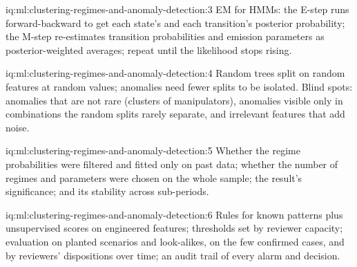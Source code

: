 \begin{solution}{iq:ml:clustering-regimes-and-anomaly-detection:3}
EM for HMMs: the E-step runs forward-backward to get each state's and each transition's posterior probability; the M-step
re-estimates transition probabilities and emission parameters as posterior-weighted averages; repeat until the likelihood stops
rising.
\end{solution}

\begin{solution}{iq:ml:clustering-regimes-and-anomaly-detection:4}
Random trees split on random features at random values; anomalies need fewer splits to be isolated. Blind spots: anomalies that
are not rare (clusters of manipulators), anomalies visible only in combinations the random splits rarely separate, and
irrelevant features that add noise.
\end{solution}

\begin{solution}{iq:ml:clustering-regimes-and-anomaly-detection:5}
Whether the regime probabilities were filtered and fitted only on past data; whether the number of regimes and parameters were
chosen on the whole sample; the result's significance; and its stability across sub-periods.
\end{solution}

\begin{solution}{iq:ml:clustering-regimes-and-anomaly-detection:6}
Rules for known patterns plus unsupervised scores on engineered features; thresholds set by reviewer capacity; evaluation on
planted scenarios and look-alikes, on the few confirmed cases, and by reviewers' dispositions over time; an audit trail of every
alarm and decision.
\end{solution}
